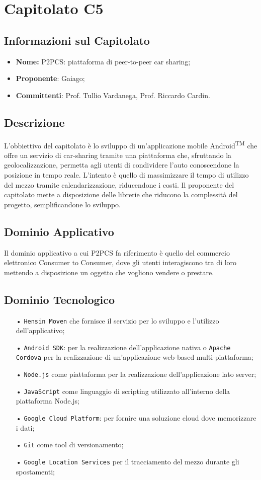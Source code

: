 \section{Capitolato C5}
\subsection{Informazioni sul Capitolato}
\begin{itemize}
	\item \textbf{Nome:} P2PCS: piattaforma di peer-to-peer car sharing;
	\item \textbf{Proponente}: Gaiago;
	\item \textbf{Committenti}: Prof. Tullio Vardanega, Prof. Riccardo Cardin.
\end{itemize}
\subsection{Descrizione}
L'obbiettivo del capitolato è lo sviluppo di un'applicazione mobile Android\textsuperscript{TM} che offre un servizio di 
car-sharing tramite una piattaforma che, sfruttando la geolocalizzazione, permetta agli utenti di condividere l'auto conoscendone la posizione in tempo reale. 
L'intento è quello di massimizzare il tempo di utilizzo del mezzo tramite calendarizzazione, 
riducendone i costi. 
Il proponente del capitolato mette a disposizione delle librerie che riducono la 
complessità del progetto, semplificandone lo sviluppo.

\subsection{Dominio Applicativo}
Il dominio applicativo a cui P2PCS fa riferimento è quello del commercio elettronico Consumer to Consumer, dove gli utenti interagiscono tra di loro mettendo a disposizione un oggetto che vogliono vendere o prestare.

\subsection{Dominio Tecnologico}
\begin{itemize}
\item[•] \texttt{Hensin Moven} che fornisce il servizio per lo sviluppo e l'utilizzo dell'applicativo;
\item[•] \texttt{Android SDK}: per la realizzazione dell'applicazione nativa o \texttt{Apache Cordova} per
 la realizzazione di un'applicazione web-based multi-piattaforma;
\item[•] \texttt{Node.js} come piattaforma per la realizzazione dell'applicazione lato server;
\item[•] \texttt{JavaScript} come linguaggio di scripting utilizzato all'interno della piattaforma Node.js;
\item[•] \texttt{Google Cloud Platform}: per fornire una soluzione cloud dove memorizzare i dati;
\item[•] \texttt{Git} come tool di versionamento;
\item[•] \texttt{Google Location Services} per il tracciamento del mezzo durante gli spostamenti;
\end{itemize}

